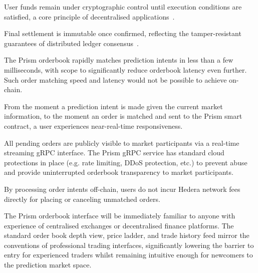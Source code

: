 \documentclass[11pt,a4paper]{article}
\begin{document}
\begin{description}[leftmargin=0em, style=nextline]
    \item[Non-Custodial Architecture] User funds remain under cryptographic control until execution conditions are satisfied, a core principle of decentralised applications~\cite{poon2016}.
    \item[Immutable Settlement] Final settlement is immutable once confirmed, reflecting the tamper-resistant guarantees of distributed ledger consensus~\cite{szabo1997}.
    \item[Low Latency] The Prism orderbook rapidly matches prediction intents in less than a few milliseconds, with scope to significantly reduce orderbook latency even further. Such order matching speed and latency would not be possible to achieve on-chain.
    \item[Near Real-Time Responsiveness] From the moment a prediction intent is made given the current market information, to the moment an order is matched and sent to the Prism smart contract, a user experiences near-real-time responsiveness.
    \item[Orderbook Transparency] All pending orders are publicly visible to market participants via a real-time streaming gRPC interface. The Prism gRPC service has standard cloud protections in place (e.g. rate limiting, DDoS protection, etc.) to prevent abuse and provide uninterrupted orderbook transparency to market participants.
    \item[Low Fees] By processing order intents off-chain, users do not incur Hedera network fees directly for placing or canceling unmatched orders.
    \item[Familiar Interface] The Prism orderbook interface will be immediately familiar to anyone with experience of centralised exchanges or decentralised finance platforms. The standard order book depth view, price ladder, and trade history feed mirror the conventions of professional trading interfaces, significantly lowering the barrier to entry for experienced traders whilst remaining intuitive enough for newcomers to the prediction market space.
\end{description}
\end{document}
